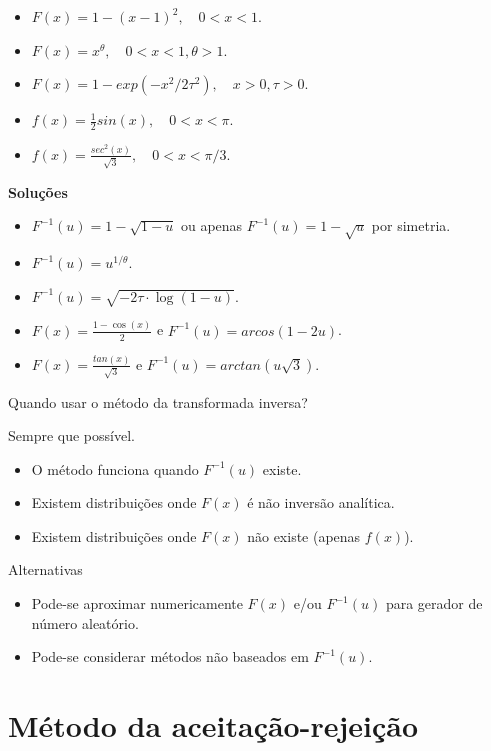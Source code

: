 \documentclass[
]{book}
\begin{document}
\begin{itemize}
\item
  \(F(x) = 1-(x-1)^2, \quad 0<x<1\).
\item
  \(F(x) = x^{\theta}, \quad 0<x<1, \theta>1\).
\item
  \(F(x) = 1-exp(-x^2/2\tau^2), \quad x>0, \tau>0\).
\item
  \(f(x) = \frac{1}{2}sin(x), \quad 0<x<\pi\).
\item
  \(f(x) = \frac{sec^2(x)}{\sqrt{3}}, \quad 0<x<\pi/3\).
\end{itemize}

\textbf{Soluções}

\begin{itemize}
\item
  \(F^{-1}(u) = 1-\sqrt{1-u}\) ou apenas \(F^{-1}(u)=1-\sqrt{u}\) por
  simetria.
\item
  \(F^{-1}(u) = u^{1/\theta}\).
\item
  \(F^{-1}(u) = \sqrt{-2\tau \cdot \log(1-u)}\).
\item
  \(F(x) = \frac{1-\cos(x)}{2}\) e \(F^{-1}(u)=arcos(1-2u)\).
\item
  \(F(x) = \frac{tan(x)}{\sqrt{3}}\) e \(F^{-1}(u) = arctan(u\sqrt3)\).
\end{itemize}

Quando usar o método da transformada inversa?

Sempre que possível.

\begin{itemize}
\item
  O método funciona quando \(F^{-1}(u)\) existe.
\item
  Existem distribuições onde \(F(x)\) é não inversão analítica.
\item
  Existem distribuições onde \(F(x)\) não existe (apenas \(f(x)\)).
\end{itemize}

Alternativas

\begin{itemize}
\item
  Pode-se aproximar numericamente \(F(x)\) e/ou \(F^{-1}(u)\) para gerador
  de número aleatório.
\item
  Pode-se considerar métodos não baseados em \(F^{-1}(u)\).
\end{itemize}

\chapter{Método da aceitação-rejeição}\label{muxe9todo-da-aceitauxe7uxe3o-rejeiuxe7uxe3o}
\end{document}

